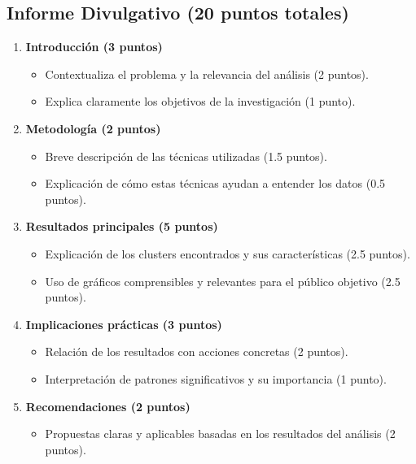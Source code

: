 \documentclass[a4,11pt]{aleph-notas}
\begin{document}
\subsection*{Informe Divulgativo (20 puntos totales)}
\begin{enumerate}[leftmargin=*, label=\textbf{\arabic*.}]
    \item \textbf{Introducción (3 puntos)}
    \begin{itemize}[leftmargin=*]
        \item Contextualiza el problema y la relevancia del análisis (2 puntos).
        \item Explica claramente los objetivos de la investigación (1 punto).
    \end{itemize}
    
    \item \textbf{Metodología (2 puntos)}
    \begin{itemize}[leftmargin=*]
        \item Breve descripción de las técnicas utilizadas  (1.5 puntos).
        \item Explicación de cómo estas técnicas ayudan a entender los datos (0.5 puntos).
    \end{itemize}
    
    \item \textbf{Resultados principales (5 puntos)}
    \begin{itemize}[leftmargin=*]
        \item Explicación de los clusters encontrados y sus características (2.5 puntos).
        \item Uso de gráficos comprensibles y relevantes para el público objetivo (2.5 puntos).
    \end{itemize}
    
    \item \textbf{Implicaciones prácticas (3 puntos)}
    \begin{itemize}[leftmargin=*]
        \item Relación de los resultados con acciones concretas (2 puntos).
        \item Interpretación de patrones significativos y su importancia (1 punto).
    \end{itemize}
    
    \item \textbf{Recomendaciones (2 puntos)}
    \begin{itemize}[leftmargin=*]
        \item Propuestas claras y aplicables basadas en los resultados del análisis (2 puntos).
    \end{itemize}
    

\end{enumerate}
\end{document}
